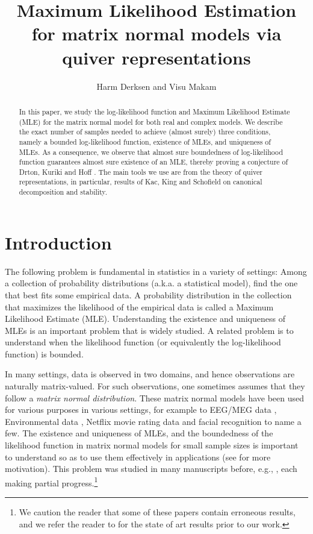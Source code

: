 \documentclass[11pt]{amsart}
\title{Maximum Likelihood Estimation for matrix normal models via quiver representations}
\author{Harm Derksen and Visu Makam}
\theoremstyle{definition}
\begin{document}
\maketitle

\begin{abstract}
In this paper, we study the log-likelihood function and Maximum Likelihood Estimate (MLE) for the matrix normal model for both real and complex models.  We describe the exact number of samples needed to achieve (almost surely) three conditions, namely a bounded log-likelihood function, existence of MLEs, and uniqueness of MLEs.  As a consequence, we observe that almost sure boundedness of log-likelihood function guarantees almost sure existence of  an MLE, thereby proving a conjecture of Drton, Kuriki and Hoff \cite{Drton-etal}. The main tools we use are from the theory of quiver representations, in particular, results of Kac, King and Schofield on canonical decomposition and stability. 
\end{abstract}

\tableofcontents

\section{Introduction}
The following problem is fundamental in statistics in a variety of settings: Among a collection of probability distributions (a.k.a. a statistical model), find the one that best fits some empirical data. A probability distribution in the collection that maximizes the likelihood of the empirical data is called a Maximum Likelihood Estimate (MLE). Understanding the existence and uniqueness of  MLEs is an important problem that is widely studied. A related problem is to understand when the likelihood function (or equivalently the log-likelihood function) is bounded. 

In many settings, data is observed in two domains, and hence observations are naturally matrix-valued. For such observations, one sometimes assumes that they follow a {\em matrix normal distribution}. These matrix normal models have been used for various purposes in various settings, for example to EEG/MEG data \cite{Ros4, Ros6, Ros10, Ros21}, Environmental data \cite{Ros8,Ros18}, Netflix movie rating data \cite{Ros1} and facial recognition \cite{Ros25} to name a few. The existence and uniqueness of MLEs, and the boundedness of the likelihood function in matrix normal models for small sample sizes is important to understand so as to use them effectively in applications (see \cite{Drton-etal} for more motivation). This problem was studied in many manuscripts before, e.g., \cite{Dut99, Ros, Srivastava, Drton-etal}, each making partial progress.\footnote{We caution the reader that some of these papers contain erroneous results, and we refer the reader to \cite{AKRS, Drton-etal} for the state of art results prior to our work.} 
\end{document}
